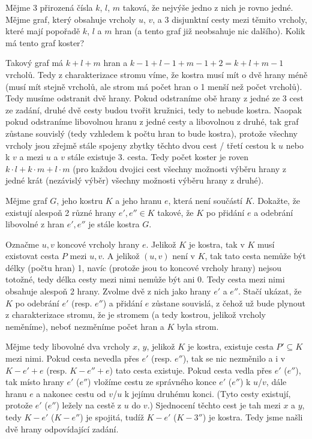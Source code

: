 \documentclass[12pt]{article}					%
\begin{document}
\begin{priklad}[1]
    Mějme 3 přirozená čísla $k$, $l$, $m$ taková, že nejvýše jedno z nich je rovno jedné. Mějme graf, který obsahuje vrcholy $u$, $v$, a 3 disjunktní cesty mezi těmito vrcholy, které mají popořadě $k$, $l$ a $m$ hran (a tento graf již neobsahuje nic dalšího). Kolik má tento graf koster?
    
    \begin{reseni}
            Takový graf má $k+l+m$ hran a $k-1+l-1+m-1 + 2 = k+l+m-1$ vrcholů. Tedy z charakterizace stromu víme, že kostra musí mít o dvě hrany méně (musí mít stejně vrcholů, ale strom má počet hran o 1 menší než počet vrcholů). Tedy musíme odstranit dvě hrany. Pokud odstraníme obě hrany z jedné ze 3 cest ze zadání, druhé dvě cesty budou tvořit kružnici, tedy to nebude kostra. Naopak pokud odstraníme libovolnou hranu z jedné cesty a libovolnou z druhé, tak graf zůstane souvislý (tedy vzhledem k počtu hran to bude kostra), protože všechny vrcholy jsou zřejmě stále spojeny zbytky těchto dvou cest / třetí cestou k $u$ nebo k $v$ a mezi $u$ a $v$ stále existuje 3. cesta. Tedy počet koster je roven $k·l + k·m + l·m$ (pro každou dvojici cest všechny možnosti výběru hrany z jedné krát (nezávislý výběr) všechny možnosti výběru hrany z druhé).
    \end{reseni}
\end{priklad}

\begin{priklad}[2]
    Mějme graf $G$, jeho kostru $K$ a jeho hranu $e$, která není součástí $K$. Dokažte, že existují alespoň 2 různé hrany $e', e'' \in K$ takové, že $K$ po přidání $e$ a odebrání libovolné z hran $e', e''$ je stále kostra $G$.


    \begin{reseni}
        Označme $u, v$ koncové vrcholy hrany $e$. Jelikož $K$ je kostra, tak v $K$ musí existovat cesta $P$ mezi $u, v$. A jelikož $(u, v)$ není v $K$, tak tato cesta nemůže být délky (počtu hran) 1, navíc (protože jsou to koncové vrcholy hrany) nejsou totožné, tedy délka cesty mezi nimi nemůže být ani 0. Tedy cesta mezi nimi obsahuje alespoň 2 hrany. Zvolme dvě z nich jako hrany $e'$ a $e''$. Stačí ukázat, že $K$ po odebrání $e'$ (resp. $e''$) a přidání $e$ zůstane souvislá, z čehož už bude plynout z charakterizace stromu, že je stromem (a tedy kostrou, jelikož vrcholy neměníme), neboť nezměníme počet hran a $K$ byla strom.

        Mějme tedy libovolné dva vrcholy $x$, $y$, jelikož $K$ je kostra, existuje cesta $P' \subseteq K$ mezi nimi. Pokud cesta nevedla přes $e'$ (resp. $e''$), tak se nic nezměnilo a i v $K-e'+e$ (resp. $K-e''+e$) tato cesta existuje. Pokud cesta vedla přes $e'$ ($e''$), tak místo hrany $e'$ ($e''$) vložíme cestu ze správného konce $e'$ ($e''$) k $u$/$v$, dále hranu $e$ a nakonec cestu od $v$/$u$ k jejímu druhému konci. (Tyto cesty existují, protože $e'$ ($e''$) ležely na cestě z $u$ do $v$.) Sjednocení těchto cest je tah mezi $x$ a $y$, tedy $K - e'$ ($K-e''$) je spojitá, tudíž $K - e'$ ($K - 3''$) je kostra. Tedy jsme našli dvě hrany odpovídající zadání.
    \end{reseni}
\end{priklad}
\end{document}
